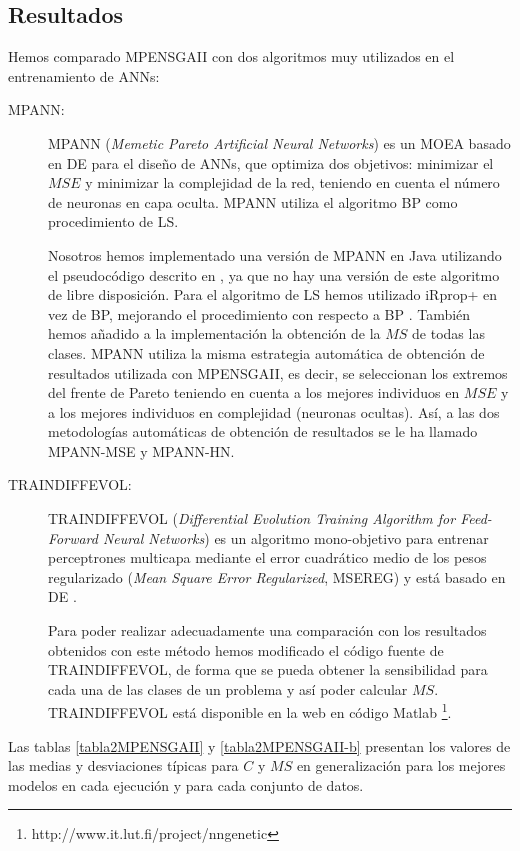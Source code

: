 \subsection{Resultados} \label{resultadosMPENSGAII}
\noindent Hemos comparado MPENSGAII con dos algoritmos muy utilizados en el
entrenamiento de ANNs:
\begin{description}
\item[MPANN:] MPANN (\textit{Memetic Pareto Artificial Neural Networks})
\cite{Abbass2003} es un MOEA basado en DE \cite{Price2005} para el diseño de ANNs, que
optimiza dos objetivos: minimizar el $MSE$ y minimizar la complejidad de la red, teniendo
en cuenta el número de neuronas en capa oculta. MPANN utiliza el algoritmo BP como
procedimiento de LS.

Nosotros hemos implementado una versión de MPANN en Java utilizando el pseudocódigo
descrito en \cite{Abbass2003}, ya que no hay una versión de este algoritmo de libre
disposición. Para el algoritmo de LS hemos utilizado iRprop+ en vez de BP,
mejorando el procedimiento con respecto a BP \cite{Igel2000}. También hemos añadido a
la implementación la obtención de la $MS$ de todas las clases. MPANN utiliza la misma
estrategia automática de obtención de resultados
utilizada con MPENSGAII, es decir, se seleccionan los extremos del frente de Pareto
teniendo en cuenta a los mejores individuos en $MSE$ y a los mejores individuos en complejidad
(neuronas ocultas). Así, a las dos metodologías automáticas de obtención de resultados se
le ha llamado MPANN-MSE y MPANN-HN.

\item[TRAINDIFFEVOL:] TRAINDIFFEVOL (\textit{Differential Evolution Training Algorithm for
Feed-Forward Neural Networks}) \cite{Jarno2003} es un algoritmo mono-objetivo para
entrenar perceptrones multicapa mediante el error cuadrático medio de los
pesos regularizado (\textit{Mean Square Error Regularized}, MSEREG) y está basado en DE
\cite{Price2005}.

Para poder realizar adecuadamente una comparación con los resultados obtenidos con este
método hemos modificado el código fuente de TRAINDIFFEVOL, de forma que se pueda obtener
la sensibilidad para cada una de las clases de un problema y así poder calcular
$MS$. TRAINDIFFEVOL está disponible en la web en código Matlab
\footnote{http://www.it.lut.fi/project/nngenetic}.
\end{description}

Las tablas \ref{tabla2MPENSGAII} y \ref{tabla2MPENSGAII-b} presentan los valores de las medias y
desviaciones típicas
para $C$ y $MS$ en generalización para los mejores modelos en cada ejecución y para cada
conjunto de datos.

